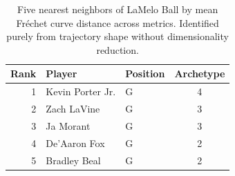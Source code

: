 \begin{table}[htbp]
  \centering\small
  \begin{tabular}{rllc}
    \toprule
    Rank & Player & Position & Archetype \\
    \midrule
    1 & Kevin Porter Jr. & G & 4 \\
    2 & Zach LaVine & G & 3 \\
    3 & Ja Morant & G & 3 \\
    4 & De'Aaron Fox & G & 2 \\
    5 & Bradley Beal & G & 2 \\
    \bottomrule
  \end{tabular}
  \caption{Five nearest neighbors of LaMelo Ball by mean Fr\'{e}chet curve distance across metrics. Identified purely from trajectory shape without dimensionality reduction.}
  \label{tab:LaMelo_Ball_frechet_curve_neighbors}
\end{table}

